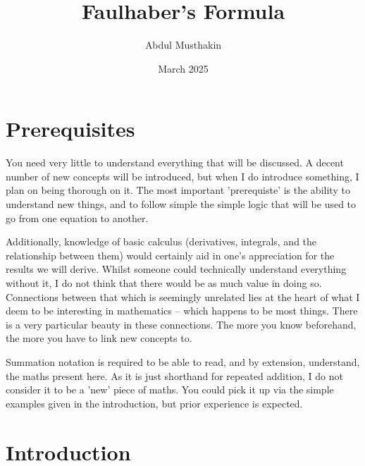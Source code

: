 \documentclass[12pt]{article}
\title{Faulhaber's Formula}
\author{Abdul Musthakin}
\date{March 2025}
\theoremstyle{definition}
\begin{document}
\maketitle

\section{Prerequisites}

You need very little to understand everything that will be discussed.
A decent number of new concepts will be introduced, but when I do introduce something, I plan on being thorough on it.
The most important 'prerequiste' is the ability to understand new things, and to follow simple the simple logic that will be used to go from one equation to another.

Additionally, knowledge of basic calculus (derivatives, integrals, and the relationship between them) would certainly aid in one's appreciation for the results we will derive.
Whilst someone could technically understand everything without it, I do not think that there would be as much value in doing so.
Connections between that which is seemingly unrelated lies at the heart of what I deem to be interesting in mathematics -- which happens to be most things.
There is a very particular beauty in these connections.
The more you know beforehand, the more you have to link new concepts to.

Summation notation is required to be able to read, and by extension, understand, the maths present here.
As it is just shorthand for repeated addition, I do not consider it to be a 'new' piece of maths.
You could pick it up via the simple examples given in the introduction, but prior experience is expected.

\section{Introduction}
\end{document}
